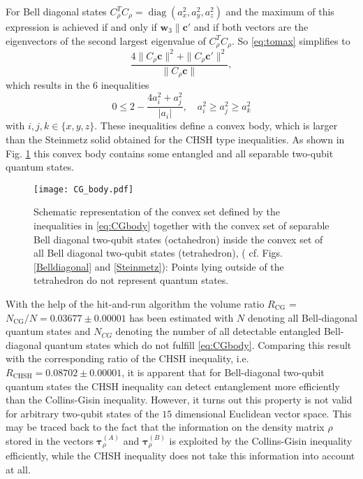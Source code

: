 \documentclass[12pt]{iopart}
\begin{document}
For Bell diagonal states $C^T_{\rho}C_{\rho}=\operatorname{diag}(a^2_x, a^2_y, a^2_z)$ and the maximum of this expression is achieved if and only if $\bm{w}_3 \parallel \bm{c}'$ and if both vectors are the eigenvectors of the second 
largest eigenvalue of $C^T_{\rho}C_{\rho}$.
So  \eqref{eq:tomax} simplifies to
\begin{equation}
 \frac{4\|C_{\rho} \bm{c}\|^2+\|C_{\rho} \bm{c}'\|^2}{\|C_{\rho} \bm{c}\|}, \nonumber
\end{equation}
which results in the $6$ inequalities
\begin{equation}\label{eq:CGbody}
 0\leqslant 2 - \frac{4 a^2_i + a^2_j}{|a_i|}, \quad a^2_i \geqslant a^2_j \geqslant a^2_k
\end{equation}
with $i,j,k \in \{x,y,z\}$. These inequalities define a convex body, which is larger than the Steinmetz solid obtained for the CHSH type inequalities. As shown
in Fig. \ref{CGbody} this convex body contains some entangled and all separable two-qubit quantum states.

\begin{figure}[t!]
   \centering
     \texttt{[image: CG\_body.pdf]}
     \caption{Schematic representation of the convex set defined by the inequalities in \eqref{eq:CGbody} together with the convex set of separable Bell diagonal two-qubit states (octahedron) inside  
     the convex set of all Bell diagonal two-qubit states (tetrahedron), ( cf. Figs. \ref{Belldiagonal} and \ref{Steinmetz}): Points lying outside of the tetrahedron do not represent quantum states.}
   \label{CGbody}
 \end{figure}

With the help of the hit-and-run algorithm the volume ratio $R_{\text{CG}}$ = $N_{\text{CG}}/N =  0.03677 \pm 0.00001$ has been estimated with $N$ denoting all Bell-diagonal quantum states and $N_{CG}$ 
denoting the number of all detectable entangled Bell-diagonal
quantum states which do not fulfill \eqref{eq:CGbody}. Comparing this result with the corresponding ratio of the CHSH inequality, i.e.
$R_{\text{CHSH}}=0.08702 \pm 0.00001$, it is apparent that for Bell-diagonal two-qubit quantum states
the CHSH inequality can detect entanglement more efficiently than the Collins-Gisin inequality. However, it turns out this property is not valid for arbitrary two-qubit states of the $15$ dimensional 
Euclidean vector space. This may be traced back to the fact that the information on the density matrix $\rho$ stored in the vectors $\bm{\tau}^{(A)}_{\rho}$ and $\bm{\tau}^{(B)}_{\rho}$ is exploited by the Collins-Gisin inequality efficiently,
while the CHSH inequality does not take this information into account at all. 
 
\end{document}
